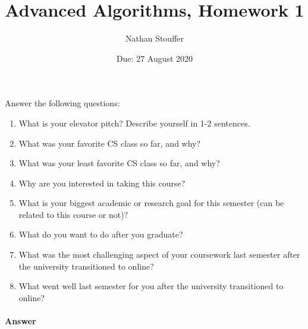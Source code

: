 \documentclass{article}
\title{Advanced Algorithms, Homework 1}
\author{Nathan Stouffer}
\date{Due: 27 August 2020}
\begin{document}
\maketitle



\nextprob
{}

Answer the following questions:
\begin{enumerate}
    \item What is your elevator pitch?  Describe yourself in 1-2
                sentences.
    \item What was your favorite CS class so far, and why?
    \item What was your least favorite CS class so far, and why?
    \item Why are you interested in taking this course?
    \item What is your biggest academic or research goal for this semester (can
        be related to this course or not)?
    \item What do you want to do after you graduate?
    \item What was the most challenging aspect of your coursework last semester
        after the university transitioned to online?
    \item What went well last semester for you after the university transitioned
        to online?
\end{enumerate}

\paragraph{Answer}

\end{document}
